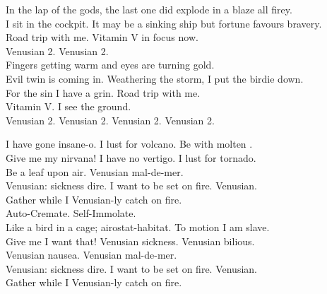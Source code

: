 


In the lap of the gods, the last one did explode in a blaze all firey. \\
I sit in the cockpit. It may be a sinking ship but fortune favours bravery. \\
Road trip with me. Vitamin V in focus now. \\

Venusian 2. Venusian 2. \\

Fingers getting warm and eyes are turning gold. \\
Evil twin is coming in. Weathering the storm, I put the birdie down. \\
For the sin I have a grin. Road trip with me. \\
Vitamin V. I see the ground. \\

Venusian 2. Venusian 2. Venusian 2. Venusian 2. \\




I have gone insane-o. I lust for volcano. Be with molten . \\
Give me my nirvana! I have no vertigo. I lust for tornado. \\
Be a leaf upon air. Venusian mal-de-mer. \\

Venusian: sickness dire. I want to be set on fire. Venusian. \\
Gather while I Venusian-ly catch on fire. \\

Auto-Cremate. Self-Immolate. \\

Like a bird in a cage; airostat-habitat. To motion I am slave. \\
Give me  I want that! Venusian sickness. Venusian bilious. \\
Venusian nausea. Venusian mal-de-mer. \\

Venusian: sickness dire. I want to be set on fire. Venusian. \\
Gather while I Venusian-ly catch on fire. \\

